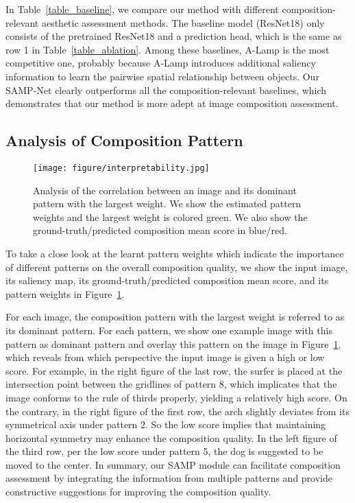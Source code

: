 \documentclass{bmvc2k}
\begin{document}
In Table~\ref{table_baseline}, we compare our method with different composition-relevant aesthetic assessment methods.
The baseline model (ResNet18) only consists of the pretrained ResNet18 and a prediction head, which is the same as row 1 in Table~\ref{table_ablation}.
Among these baselines, A-Lamp is the most competitive one, probably because A-Lamp introduces additional saliency information to learn the pairwise spatial relationship between objects. 
Our SAMP-Net clearly outperforms all the composition-relevant baselines, which demonstrates that our method is more adept at image composition assessment.  

\subsection{Analysis of Composition Pattern}
\label{pattern_analysis}
\begin{figure}[tbp]
\begin{center}
  \texttt{[image: figure/interpretability.jpg]}
\end{center}
  \vspace{-6mm}
   \caption{Analysis of the correlation between an image and its dominant pattern with the largest weight. We show the estimated pattern weights and the largest weight is colored green. We also show the ground-truth/predicted composition mean score in blue/red.}
  \vspace{-5mm}
\label{fig:model_interpretability}
\end{figure}



To take a close look at the learnt pattern weights which indicate the importance of different patterns on the overall composition quality, we show the input image, its saliency map, its ground-truth/predicted composition mean score, and its pattern weights in Figure~\ref{fig:model_interpretability}. 

For each image, the composition pattern with the largest weight is referred to as its dominant pattern. For each pattern, we show one example image with this pattern as dominant pattern and overlay this pattern on the image in Figure~\ref{fig:model_interpretability}, which reveals from which perspective the input image is given a high or low score.
For example, in the right figure of the last row, the surfer is placed at the intersection point between the gridlines of pattern 8, which implicates that the image conforms to the rule of thirds properly, yielding a relatively high score.
On the contrary, in the right figure of the first row, the arch slightly deviates from its symmetrical axis under pattern 2. So the low score implies that maintaining horizontal symmetry may enhance the composition quality.
In the left figure of the third row, per the low score under pattern 5, the dog is suggested to be moved to the center. 
In summary, our SAMP module can facilitate composition assessment by integrating the information from multiple patterns and provide constructive suggestions for improving the composition quality.
\vspace{-2mm}
\end{document}
